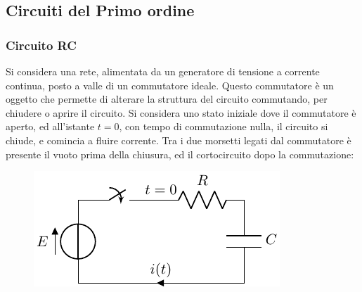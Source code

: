 \documentclass{article}
\numberwithin{equation}{subsection}
\begin{document}
\subsection{Circuiti del Primo ordine}

\subsubsection{Circuito RC}

Si considera una rete, alimentata da un generatore di tensione a corrente continua, posto a valle di un commutatore ideale. Questo commutatore è un oggetto che permette 
di alterare la struttura del circuito commutando, per chiudere o aprire il circuito. Si considera uno stato iniziale dove il commutatore è aperto, ed all'istante $t=0$, 
con tempo di commutazione nulla, il circuito si chiude, e comincia a fluire corrente. Tra i due morsetti legati dal commutatore è presente il vuoto prima della chiusura, ed 
il cortocircuito dopo la commutazione: 
\begin{figure}[H]%
    \centering
    \includegraphics{circuito-rc-tempo-continuo.pdf}%
    \label{fig:circuito-rc}
\end{figure}
\end{document}
